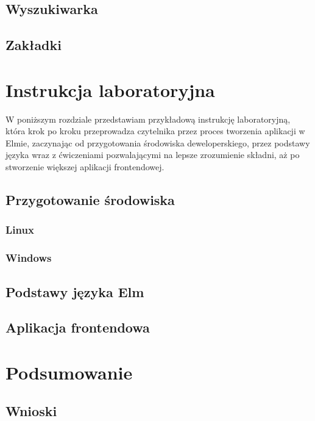 \documentclass[twoside,a4paper]{report}
\begin{document}
\section{Wyszukiwarka}

\section{Zakładki}


\chapter{Instrukcja laboratoryjna}
W poniższym rozdziale przedstawiam przykładową instrukcję laboratoryjną, która krok po kroku przeprowadza czytelnika przez proces tworzenia aplikacji w Elmie, zaczynając od przygotowania środowiska deweloperskiego, przez podstawy języka wraz z ćwiczeniami pozwalającymi na lepsze zrozumienie składni, aż po stworzenie większej aplikacji frontendowej.

\section{Przygotowanie środowiska}

\subsection{Linux}

\subsection{Windows}

\section{Podstawy języka Elm}

\section{Aplikacja frontendowa}


\chapter{Podsumowanie}

\section{Wnioski}


\listoffigures
\lstlistoflistings

\printbibliography
% 
% 

\end{document}
